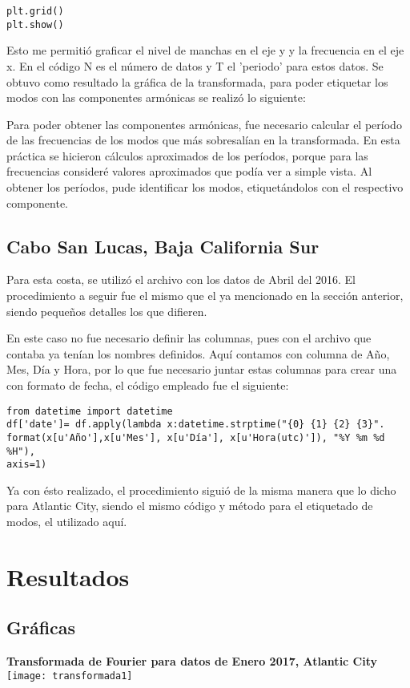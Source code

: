 \documentclass[12pt]{article}
\begin{document}
\begin{doublespace}
\begin{verbatim}
plt.grid()
plt.show()

\end{verbatim}

Esto me permitió graficar el nivel de manchas en el eje y y la frecuencia en el eje x. En el código N es el número de datos y T el 'periodo' para estos datos. Se obtuvo como resultado la gráfica de la transformada, para poder etiquetar los modos con las componentes armónicas se realizó lo siguiente:

Para poder obtener las componentes armónicas, fue necesario calcular el período de las frecuencias de los modos que más sobresalían en la transformada. En esta práctica se hicieron cálculos aproximados de los períodos, porque para las frecuencias consideré valores aproximados que podía ver a simple vista. Al obtener los períodos, pude identificar los modos, etiquetándolos con el respectivo componente.

\subsection{Cabo San Lucas, Baja California Sur}

Para esta costa, se utilizó el archivo con los datos de Abril del 2016. El procedimiento a seguir fue el mismo que el ya mencionado en la sección anterior, siendo pequeños detalles los que difieren. 

En este caso no fue necesario definir las columnas, pues con el archivo que contaba ya tenían los nombres definidos. Aquí contamos con columna de Año, Mes, Día y Hora, por lo que fue necesario juntar estas columnas para crear una con formato de fecha, el código empleado fue el siguiente:

\begin{verbatim}
from datetime import datetime
df['date']= df.apply(lambda x:datetime.strptime("{0} {1} {2} {3}".
format(x[u'Año'],x[u'Mes'], x[u'Día'], x[u'Hora(utc)']), "%Y %m %d %H"),
axis=1)
\end{verbatim}

Ya con ésto realizado, el procedimiento siguió de la misma manera que lo dicho para Atlantic City, siendo el mismo código y método para el etiquetado de modos, el utilizado aquí. 

\section{Resultados}
\subsection{Gráficas}
\begin{center}
\textbf{Transformada de Fourier para datos de Enero 2017, Atlantic City}
\texttt{[image: transformada1]}
\end{center}


\end{doublespace}
\end{document}
